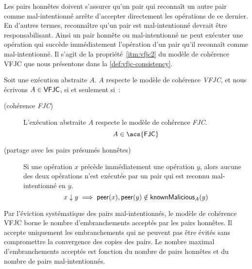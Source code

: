 Les pairs honnêtes doivent s'assurer qu'un pair qui reconnaît un autre pair comme mal-intentionné arrête d'accepter directement les opérations de ce dernier.
En d'autres termes, reconnaître qu'un pair est mal-intentionné devrait être responsabilisant.
Ainsi un pair honnête ou mal-intentionné ne peut exécuter une opération qui succède immédiatement l'opération d'un pair qu'il reconnaît comme mal-intentionné.
Il s'agit de la propriété~\ref{itm:vfjc2} du modèle de cohérence \acf{VFJC} que nous présentons dans la \autoref{def:vfjc-consistency}.

\begin{definition}\label{def:vfjc-consistency}
  Soit une exécution abstraite $A$. $A$ respecte le modèle de cohérence \emph{\acf{VFJC}}, et nous écrivons $A \in \operatorname{\mathsf{VFJC}}$, si et seulement si~:

  \begin{description}
  \item[ (cohérence \emph{\acl{FJC}})]
  L'exécution abstraite $A$ respecte le modèle de cohérence \emph{\ac{FJC}}.
  \begin{equation*}
    A \in \trm{\acs{FJC}}
  \end{equation*}

  \item[ (partage avec les pairs présumés honnêtes)]
  Si une opération $x$ précède immédiatement une opération $y$, alors aucune des deux opérations n'est exécutée par un pair qui est reconnu mal-intentionné en $y$.
  \begin{equation*}
    x \downarrow y \implies \operatorname{\mathsf{peer}}(x), \operatorname{\mathsf{peer}}(y) \notin \operatorname{\mathsf{knownMalicious}}_A(y)
  \end{equation*}
  \end{description}
\end{definition}

Par l'éviction systématique des pairs mal-intentionnés, le modèle de cohérence \ac{VFJC} borne le nombre d'embranchements acceptés par les pairs honnêtes.
Il accepte uniquement les embranchements qui ne peuvent pas être évités sans compromettre la convergence des copies des pairs.
Le nombre maximal d'embranchements acceptés est fonction du nombre de pairs honnêtes et du nombre de pairs mal-intentionnés.

